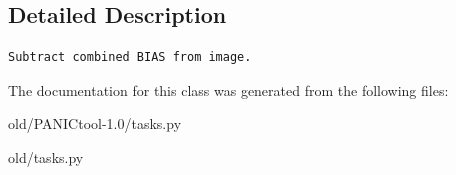 \subsection{Detailed Description}


\footnotesize\begin{verbatim}Subtract combined BIAS from image.
\end{verbatim}
\normalsize
 



The documentation for this class was generated from the following files:\begin{CompactItemize}
\item 
old/PANICtool-1.0/tasks.py\item 
old/tasks.py\end{CompactItemize}
